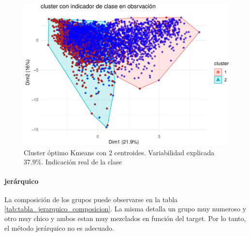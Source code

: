 \begin{figure}[!htb]
	\centering
	\includegraphics{imagenes/modelo_clusters/unnamed-chunk-21-1.pdf}
	\caption{Cluster óptimo Kmeans con 2 centroides. Variabilidad explicada 37.9\%. Indicación real de la clase}
	\label{fig:kmeans_cluster_optimo_composicion}
\end{figure}



\paragraph{\textbf{jerárquico}}

La composición de los grupos puede observarse en la tabla \ref{tab:tabla_jerarquico_composicion}. La misma detalla un grupo muy numeroso y otro muy chico y
ambos estan muy mezclados en función del target. Por lo tanto, el método
jerárquico no es adecuado.

\begin{table}[!h]
	
	\caption{\label{tab:tabla_jerarquico_composicion}Composición de clusters según la clase deserto}
	\centering
\end{table}


